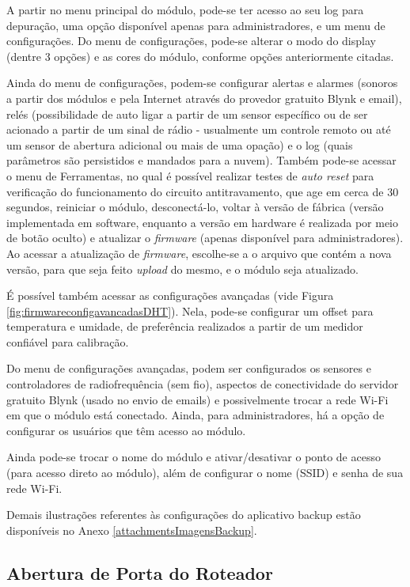 A partir no menu principal do módulo, pode-se ter acesso ao seu log para depuração, uma opção disponível apenas para administradores, e um menu de configurações. Do menu de configurações, pode-se alterar o modo do display (dentre 3 opções) e as cores do módulo, conforme opções anteriormente citadas.

Ainda do menu de configurações, podem-se configurar alertas e alarmes (sonoros a partir dos módulos e pela Internet através do provedor gratuito Blynk e email), relés (possibilidade de auto ligar a partir de um sensor específico ou de ser acionado a partir de um sinal de rádio - usualmente um controle remoto ou até um sensor de abertura adicional ou mais de uma opação) e o log (quais parâmetros são persistidos e mandados para a nuvem). Também pode-se acessar o menu de Ferramentas, no qual é possível realizar testes de \emph{auto reset} para verificação do funcionamento do circuito antitravamento, que age em cerca de 30 segundos, reiniciar o módulo, desconectá-lo, voltar à versão de fábrica (versão implementada em software, enquanto a versão em hardware é realizada por meio de botão oculto) e atualizar o \emph{firmware} (apenas disponível para administradores).
Ao acessar a atualização de \emph{firmware}, escolhe-se a o arquivo que contém a nova versão, para que seja feito \emph{upload} do mesmo, e o módulo seja atualizado.

É possível também acessar as configurações avançadas (vide Figura \ref{fig:firmwareconfigavancadasDHT}). Nela, pode-se configurar um offset para temperatura e umidade, de preferência realizados a partir de um medidor confiável para calibração.

Do menu de configurações avançadas, podem ser configurados os sensores e controladores de radiofrequência (sem fio), aspectos de conectividade do servidor gratuito Blynk (usado no envio de emails) e possivelmente trocar a rede Wi-Fi em que o módulo está conectado. Ainda, para administradores, há a opção de configurar os usuários que têm acesso ao módulo.

Ainda pode-se trocar o nome do módulo e ativar/desativar o ponto de acesso (para acesso direto ao módulo), além de configurar o nome (SSID) e senha de sua rede Wi-Fi.

Demais ilustrações referentes às configurações do aplicativo backup estão disponíveis no Anexo \ref{attachmentsImagensBackup}{}.

\subsection{Abertura de Porta do Roteador}

